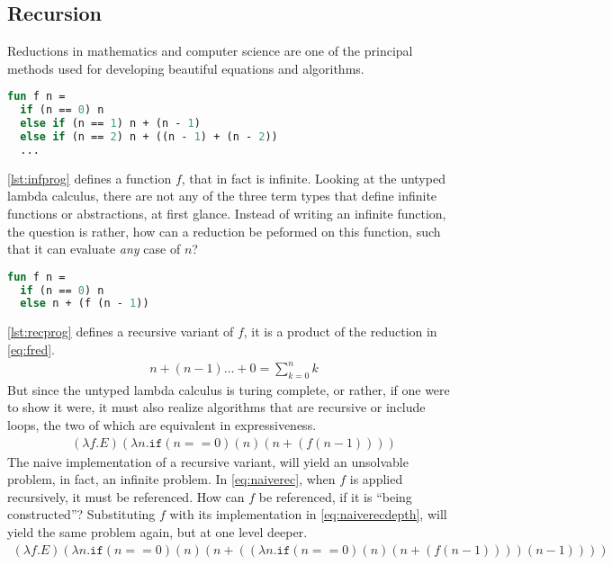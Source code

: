 \documentclass[11pt,oneside,a4paper]{report}
\begin{document}
\subsection{Recursion}
\noindent Reductions in mathematics and computer science are one of the principal methods used for developing beautiful equations and algorithms.
\begin{lstlisting}[language=ML,caption={Infinite program},label={lst:infprog}]
fun f n = 
  if (n == 0) n
  else if (n == 1) n + (n - 1)
  else if (n == 2) n + ((n - 1) + (n - 2))
  ...
\end{lstlisting}
\autoref{lst:infprog} defines a function $f$, that in fact is infinite.
Looking at the untyped lambda calculus, there are not any of the three term types that define infinite functions or abstractions, at first glance.
Instead of writing an infinite function, the question is rather, how can a reduction be peformed on this function, such that it can evaluate \textit{any} case of $n$?
\begin{lstlisting}[language=ML,caption={Recursive program},label={lst:recprog}]
fun f n = 
  if (n == 0) n
  else n + (f (n - 1))
\end{lstlisting}
\autoref{lst:recprog} defines a recursive variant of $f$, it is a product of the reduction in \autoref{eq:fred}.
\begin{align}
    n + (n - 1) \dots + 0 = \sum_{k = 0}^n k
    \label{eq:fred}
\end{align}
But since the untyped lambda calculus is turing complete, or rather, if one were to show it were,
it must also realize algorithms that are recursive or include loops, the two of which are equivalent in expressiveness.
\begin{align}
    (\lambda f . E) (\lambda n . \texttt{if} (n == 0) (n) (n + (f (n - 1))))
    \label{eq:naiverec}
\end{align}
The naive implementation of a recursive variant, will yield an unsolvable problem, in fact, an infinite problem.
In \autoref{eq:naiverec}, when $f$ is applied recursively, it must be referenced.
How can $f$ be referenced, if it is ``being constructed''?
Substituting $f$ with its implementation in \autoref{eq:naiverecdepth}, will yield the same problem again, but at one level deeper.
\begin{align}
    (\lambda f . E) (\lambda n . \texttt{if} (n == 0) (n) (n + ((\lambda n . \texttt{if} (n == 0) (n) (n + (f (n - 1)))) (n - 1))))
    \label{eq:naiverecdepth}
\end{align}
\end{document}
